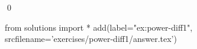 
\begin{ex} 
  \label{ex:power-diff1}
  
  \qed
\end{ex} 
\begin{python0}
from solutions import *
add(label="ex:power-diff1",
    srcfilename='exercises/power-diff1/answer.tex') 
\end{python0}
